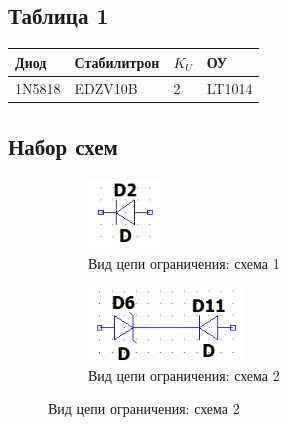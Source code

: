 \documentclass[a4paper, 12pt]{article}
\begin{document}
    \subsection{Таблица 1}
    \begin{center}
        \begin{tabular}{ | m{4em} | m{6em}| m{4em} | m{4em} | } 
        \hline
        Диод& Стабилитрон &$K_U$ &ОУ\\ 
        \hline
        1N5818& EDZV10B & 2 &LT1014\\ 
        \hline
        \end{tabular}
    \end{center}
    \subsection{Набор схем}
\begin{figure}[H]
    \centering
    \begin{subfigure}[b]{0.45\textwidth}
        \centering
        \includegraphics[width=0.45\linewidth]{in0.png}
        \captionsetup{skip=0pt}
        \caption{Вид цепи ограничения: схема 1}
        \label{fig:in0}
    \end{subfigure}
    \hfill
    \begin{subfigure}[b]{0.45\textwidth}
        \centering
        \includegraphics[width=0.9\linewidth]{in00.png}
        \captionsetup{skip=0pt}
        \caption{Вид цепи ограничения: схема 2}
        \label{fig:in00}
    \end{subfigure}
\end{figure}
\end{document}
